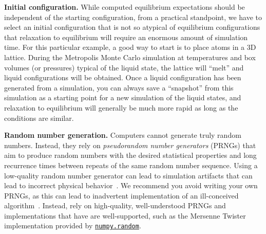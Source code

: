\documentclass[aip,jcp,preprint,superscriptaddress,floatfix]{revtex4-1}
\begin{document}
\textbf{Initial configuration.} 
While computed equilibrium expectations should be independent of the starting configuration, from a practical standpoint, we have to select an initial configuration that is not so atypical of equilibrium configurations that relaxation to equilibrium will require an enormous amount of simulation time. 
For this particular example, a good way to start is to place atoms in a 3D lattice. 
During the Metropolis Monte Carlo simulation at temperatures and box volumes (or pressures) typical of the liquid state, the lattice will ``melt'' and liquid configurations will be obtained. 
Once a liquid configuration has been generated from a simulation, you can always save a ``snapshot'' from this simulation as a starting point for a new simulation of the liquid states, and relaxation to equilibrium will generally be much more rapid as long as the conditions are similar.

\textbf{Random number generation.} 
Computers cannot generate truly random numbers.
Instead, they rely on \emph{pseudorandom number generators} (PRNGs) that aim to produce random numbers with the desired statistical properties and long recurrence times between repeats of the same random number sequence.
Using a low-quality random number generator can lead to simulation artifacts that can lead to incorrect physical behavior~\cite{Ferrenberg.PRL.69.3382.1992,Cerutti.JCTC.4.1669.2008}.
We recommend you avoid writing your own PRNGs, as this can lead to inadvertent implementation of an ill-conceived algorithm~\cite{RANDU}.
Instead, rely on high-quality, well-understood PRNGs and implementations that have are well-supported, such as the Mersenne Twister~\cite{Mersenne.Twister,Matsumoto.ACMTransModelComputSimul.8.3.1998} implementation provided by \href{https://docs.scipy.org/doc/numpy/reference/routines.random.html}{\tt numpy.random}.
\end{document}
